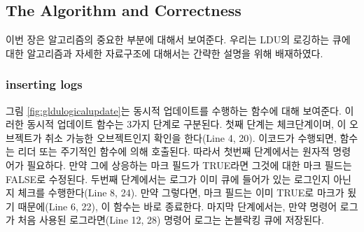 \subsection{The Algorithm and Correctness}

이번 장은 알고리즘의 중요한 부분에 대해서 보여준다.
우리는 LDU의 로깅하는 큐에 대한 알고리즘과 자세한 자료구조에 대해서는 간략한 설명을 위해 
배재하였다. 

\subsubsection{inserting logs}
그림 \ref{fig:gldulogicalupdate}는 동시적 업데이트를 수행하는 함수에 대해 보여준다.
이러한 동시적 업데이트 함수는 3가지 단계로 구분된다.
첫째 단계는 체크단계이며, 이 오브젝트가 취소 가능한 오브젝트인지 확인을 한다(Line 4, 20). 
이코드가 수행되면,  함수는 리더 또는 주기적인 함수에 의해 호출된다.
따라서 첫번째 단계에서는 원자적 명령어가 필요하다.
만약 그에 상응하는 마크 필드가 TRUE라면 그것에 대한 마크 필드는 FALSE로 수정된다.
두번째 단계에서는 로그가 이미 큐에 들어가 있는 로그인지 아닌지 체크를 수행한다(Line 8, 24).
만약 그렇다면, 마크 필드는 이미 TRUE로 마크가 됬기 때문에(Line 6, 22), 이 함수는 
바로 종료한다.
마지막 단계에서는, 만약 명령어 로그가 처음 사용된 로그라면(Line 12, 28)
 명령어 로그는 논블락킹 큐에 저장된다. 

